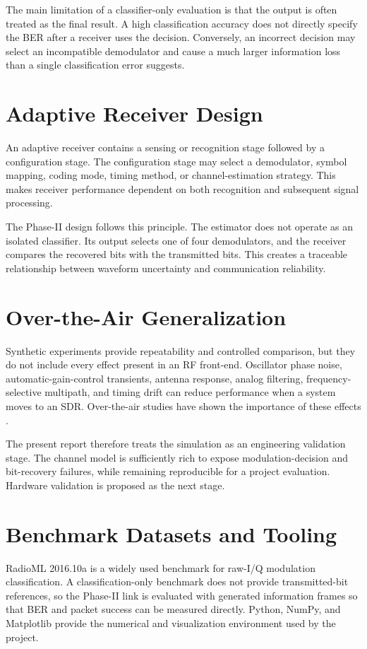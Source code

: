 \documentclass[12pt,twoside,openright]{report}
\begin{document}
The main limitation of a classifier-only evaluation is that the output is
often treated as the final result. A high classification accuracy does not
directly specify the BER after a receiver uses the decision. Conversely, an
incorrect decision may select an incompatible demodulator and cause a much
larger information loss than a single classification error suggests.

\section{Adaptive Receiver Design}
An adaptive receiver contains a sensing or recognition stage followed by a
configuration stage. The configuration stage may select a demodulator,
symbol mapping, coding mode, timing method, or channel-estimation strategy.
This makes receiver performance dependent on both recognition and subsequent
signal processing.

The Phase-II design follows this principle. The estimator does not operate
as an isolated classifier. Its output selects one of four demodulators, and
the receiver compares the recovered bits with the transmitted bits. This
creates a traceable relationship between waveform uncertainty and
communication reliability.

\section{Over-the-Air Generalization}
Synthetic experiments provide repeatability and controlled comparison, but
they do not include every effect present in an RF front-end. Oscillator phase
noise, automatic-gain-control transients, antenna response, analog filtering,
frequency-selective multipath, and timing drift can reduce performance when
a system moves to an SDR. Over-the-air studies have shown the importance of
these effects \cite{oshea2016generative}.

The present report therefore treats the simulation as an engineering
validation stage. The channel model is sufficiently rich to expose
modulation-decision and bit-recovery failures, while remaining reproducible
for a project evaluation. Hardware validation is proposed as the next stage.

\section{Benchmark Datasets and Tooling}
RadioML 2016.10a is a widely used benchmark for raw-I/Q modulation
classification. A classification-only benchmark does not provide
transmitted-bit references, so the Phase-II link is evaluated with generated
information frames so that BER and packet success can be measured directly.
Python, NumPy, and Matplotlib provide the numerical and visualization
environment used by the project.
\end{document}
